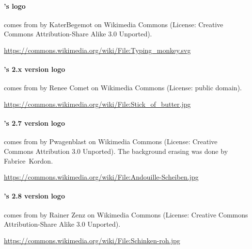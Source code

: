 \paragraph{\imitator{}'s logo} comes from  by KaterBegemot on Wikimedia Commons
	(License: Creative Commons Attribution-Share Alike 3.0 Unported).

\url{https://commons.wikimedia.org/wiki/File:Typing_monkey.svg}


\paragraph{\imitator{}'s 2.x version logo} comes from  by Renee Comet on Wikimedia Commons
	(License: public domain).

\url{https://commons.wikimedia.org/wiki/File:Stick_of_butter.jpg}

\paragraph{\imitator{}'s 2.7 version logo} comes from  by Pwagenblast on Wikimedia Commons
	(License: Creative Commons Attribution 3.0 Unported).
The background erasing was done by Fabrice~Kordon.

\url{https://commons.wikimedia.org/wiki/File:Andouille-Scheiben.jpg}


\paragraph{\imitator{}'s 2.8 version logo} comes from  by Rainer Zenz on Wikimedia Commons
	(License: Creative Commons Attribution-Share Alike 3.0 Unported).

\url{https://commons.wikimedia.org/wiki/File:Schinken-roh.jpg}


\newpage







